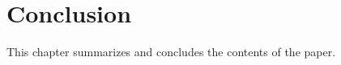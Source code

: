 

\chapter{Conclusion} \label{conclusion}

This chapter summarizes and concludes the contents of the paper.
